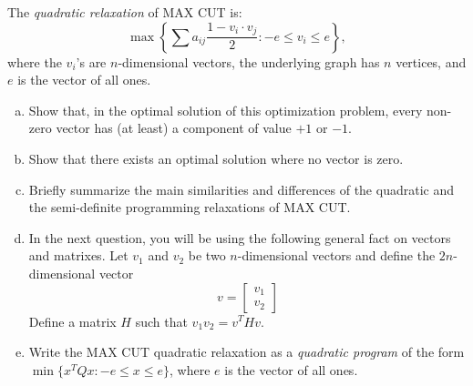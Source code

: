 \documentclass[fleqn]{homework}
\begin{document}
  \begin{problem}{3}
    \begin{question}
      The \textit{quadratic relaxation} of MAX CUT is:
      \begin{equation*}
        \max \left\{\sum a_{ij} \frac{1 - v_i \cdot v_j}{2}: -e \le v_i \le e\right\},
      \end{equation*}
      where the $v_i$'s are $n$-dimensional vectors, the underlying graph has
      $n$ vertices, and $e$ is the vector of all ones.
      \begin{enumerate}[a.]
      \item Show that, in the optimal solution of this optimization problem,
        every non-zero vector has (at least) a component of value $+1$ or $-1$.
      \item Show that there exists an optimal solution where no vector is zero.
      \item Briefly summarize the main similarities and differences of the
        quadratic and the semi-definite programming relaxations of MAX CUT.
      \item In the next question, you will be using the following general fact
        on vectors and matrixes. Let $v_1$ and $v_2$ be two $n$-dimensional
        vectors and define the $2n$-dimensional vector
        \begin{equation*}
          v = \begin{bmatrix*} v_1 \\ v_2 \end{bmatrix*}
        \end{equation*}
        Define a matrix $H$ such that $v_1 v_2 = v^T H v$.
      \item Write the MAX CUT quadratic relaxation as a \textit{quadratic
          program} of the form $\min\{x^TQx: -e \le x \le e \}$, where $e$ is
        the vector of all ones.
      \end{enumerate}
    \end{question}


\end{problem}
\end{document}
